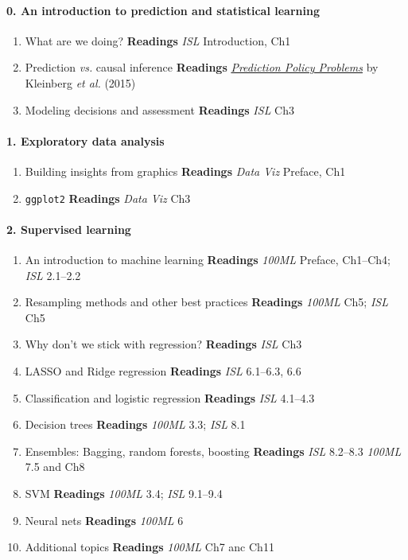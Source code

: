 \documentclass[10pt]{article}
\begin{document}
\paragraph{0. An introduction to prediction and statistical learning}
\begin{enumerate}
  \item What are we doing? \textbf{Readings} \textit{ISL} Introduction, Ch1
  \item Prediction \textit{vs.} causal inference \textbf{Readings} \href{https://www.aeaweb.org/articles?id=10.1257/aer.p20151023}{\textit{Prediction Policy Problems}} by Kleinberg \textit{et al.} (2015)
  \item Modeling decisions and assessment \textbf{Readings} \textit{ISL} Ch3
\end{enumerate}

\paragraph{1. Exploratory data analysis}
\begin{enumerate}
  \item Building insights from graphics \textbf{Readings} \textit{Data Viz} Preface, Ch1
  \item \texttt{ggplot2} \textbf{Readings} \textit{Data Viz} Ch3
\end{enumerate}

\paragraph{2. Supervised learning}
\begin{enumerate}
  \item An introduction to machine learning \textbf{Readings} \textit{100ML} Preface, Ch1--Ch4; \textit{ISL} 2.1--2.2
  \item Resampling methods and other best practices \textbf{Readings} \textit{100ML} Ch5; \textit{ISL} Ch5
  \item Why don't we stick with regression? \textbf{Readings} \textit{ISL} Ch3
  \item LASSO and Ridge regression \textbf{Readings} \textit{ISL} 6.1--6.3, 6.6
  \item Classification and logistic regression \textbf{Readings} \textit{ISL} 4.1--4.3
  \item Decision trees \textbf{Readings} \textit{100ML} 3.3; \textit{ISL} 8.1
  \item Ensembles: Bagging, random forests, boosting \textbf{Readings} \textit{ISL} 8.2--8.3 \textit{100ML} 7.5 and Ch8
  \item SVM \textbf{Readings} \textit{100ML} 3.4; \textit{ISL} 9.1--9.4
  \item Neural nets \textbf{Readings} \textit{100ML} 6
  \item Additional topics \textbf{Readings} \textit{100ML} Ch7 anc Ch11
\end{enumerate}
\end{document}
